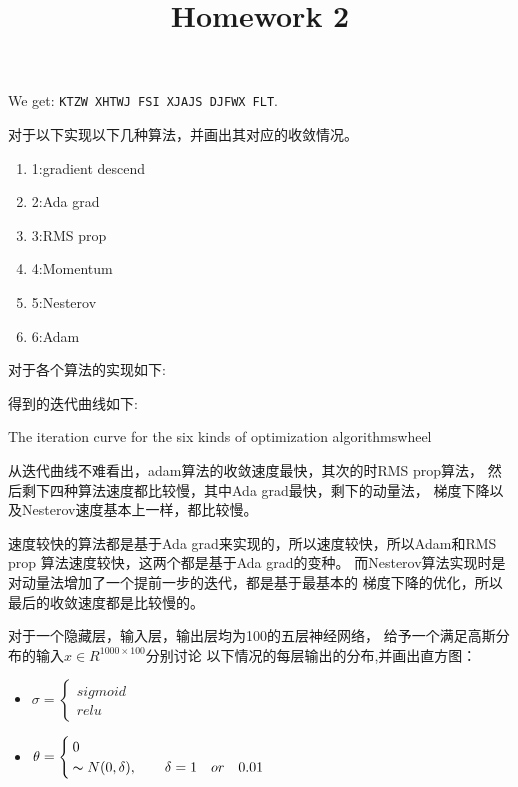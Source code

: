 \documentclass{homework}
\begin{document}


We get: \texttt{KTZW XHTWJ FSI XJAJS DJFWX FLT}.

\fi 


\title{ Homework 2}

\question 对于以下实现以下几种算法，并画出其对应的收敛情况。
\begin{enumerate}
	\item 1:gradient descend
	\item 2:Ada grad
	\item 3:RMS prop
	\item 4:Momentum
	\item 5:Nesterov
	\item  6:Adam
\end{enumerate}

对于各个算法的实现如下:




得到的迭代曲线如下:

{The iteration curve for the six kinds of optimization algorithms}{wheel}



从迭代曲线不难看出，adam算法的收敛速度最快，其次的时RMS prop算法，
然后剩下四种算法速度都比较慢，其中Ada grad最快，剩下的动量法，
梯度下降以及Nesterov速度基本上一样，都比较慢。

速度较快的算法都是基于Ada grad来实现的，所以速度较快，所以Adam和RMS prop
算法速度较快，这两个都是基于Ada grad的变种。
而Nesterov算法实现时是对动量法增加了一个提前一步的迭代，都是基于最基本的
梯度下降的优化，所以最后的收敛速度都是比较慢的。


\question 对于一个隐藏层，输入层，输出层均为100的五层神经网络，
给予一个满足高斯分布的输入$x\in R^{1000\times 100}$分别讨论
以下情况的每层输出的分布,并画出直方图：
\begin{itemize}
	\item  $\sigma = \begin{cases}
  sigmoid \\ relu \end{cases}$
	\item  $\theta = \begin{cases}
		0 \\   \thicksim N(0, \delta) ,\qquad \delta = 1 \quad or \quad 0.01 \end{cases}$
\end{itemize}
\end{document}
